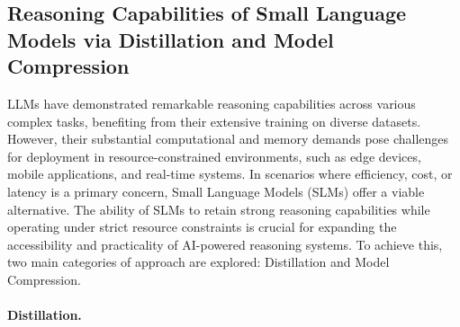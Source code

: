 \subsection{Reasoning Capabilities of Small Language Models via Distillation and Model Compression}
\label{sec:compression}

LLMs have demonstrated remarkable reasoning capabilities across various complex tasks, benefiting from their extensive training on diverse datasets. However, their substantial computational and memory demands pose challenges for deployment in resource-constrained environments, such as edge devices, mobile applications, and real-time systems. In scenarios where efficiency, cost, or latency is a primary concern, Small Language Models (SLMs) offer a viable alternative. The ability of SLMs to retain strong reasoning capabilities while operating under strict resource constraints is crucial for expanding the accessibility and practicality of AI-powered reasoning systems. To achieve this, two main categories of approach are explored: Distillation and Model Compression.



\paragraph{\textbf{Distillation.}}

